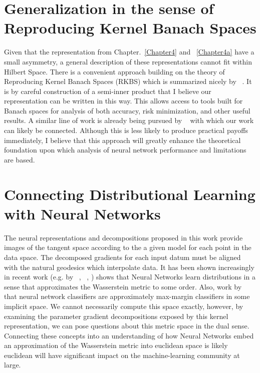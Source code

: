 \section{Generalization in the sense of Reproducing Kernel Banach Spaces}
Given that the representation from Chapter.~\ref{Chapter4} and
~\ref{Chapter4a} have a small asymmetry, a general description of
these representations cannot fit within Hilbert Space. There is a
convenient approach building on the theory of Reproducing Kernel
Banach Spaces (RKBS) which is summarized nicely by
~\citet{zhang2009reproducing}. It is by careful construction of a
semi-inner product that I believe our representation can be written in
this way. This allows access to tools built for Banach spaces for
analysis of both accuracy, risk minimization, and other useful
results. A similar line of work is already being pursued by
~\citet{shilton_gradient_2023} with which our work can likely be
connected. Although this is less likely to produce practical
payoffs immediately, I believe that this approach will greatly enhance
the theoretical foundation upon which analysis of neural network
performance and limitations are based. 

\section{Connecting Distributional Learning with Neural Networks}

The neural representations and decompositions proposed in this work
provide images of the tangent space according to the
a given model for each point in the data space. The decomposed gradients for each input datum must be aligned with the natural geodesics which interpolate data. It has been shown increasingly in recent work
(e.g. by  ~\citet{lu2020universal}, ~\citet{yang2022capacity}, \citet{altekruger_neural_2023}) shows that Neural Networks
learn distributions in a sense that approximates the Wasserstein
metric to some order. Also, work by ~\citet{chizat2020maxmargin} that neural network
classifiers are approximately max-margin classifiers in some
implicit space. We cannot necessarily compute this space exactly,
however, by examining the parameter gradient decompositions exposed by this kernel representation, we can pose questions about this metric space in the
dual sense. Connecting these concepts into an
understanding of how Neural Networks embed an approximation of the
Wasserstein metric into euclidean space is likely
euclidean will have significant impact on the machine-learning
community at large. 



